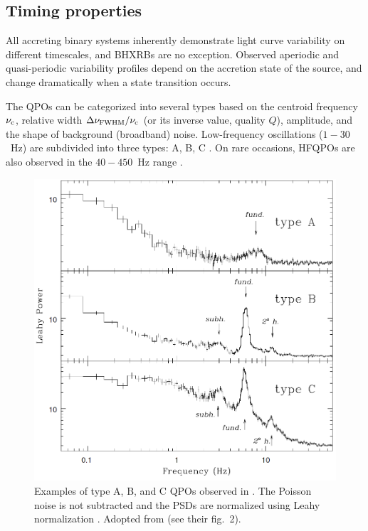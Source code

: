 \subsection{Timing properties}
All accreting binary systems inherently demonstrate light curve variability on different timescales, and \glspl{BHXRB} are no exception.
Observed aperiodic and quasi-periodic variability profiles depend on the accretion state of the source, and change dramatically when a state transition occurs.


The \glspl{QPO} can be categorized into several types based on the centroid frequency $\nu_{\mathrm{c}}$, relative width $\Delta\nu_{\mathrm{FWHM}}/\nu_{\mathrm{c}}$ (or its inverse value, quality $Q$), amplitude, and the shape of background (broadband) noise.
Low-frequency oscillations ($1-30$~Hz) are subdivided into three types: A, B, C \citep[][ also see Fig.~\ref{fig:bh-qpos}]{Casella2004}.
On rare occasions, \glspl{HFQPO} are also observed in the $40-450$~Hz range \citep{Belloni2012}.

\begin{figure}
    \centering
    \includegraphics[keepaspectratio, width = 1\linewidth]{images/qpos.png}
    \caption{
        Examples of type A, B, and C \glspl{QPO} observed in \XTEJqpo.
        The Poisson noise is not subtracted and the \glspl{PSD} are normalized using Leahy normalization \citep{Leahy1983}.
        Adopted from \citet{Casella2004} (see their fig.~2).
    }
    \label{fig:bh-qpos}
\end{figure}


